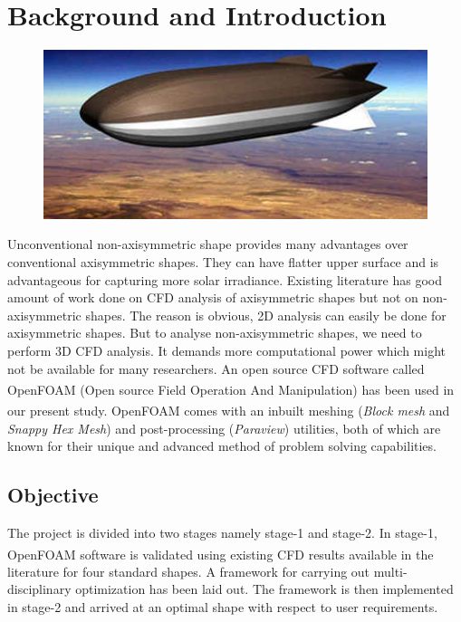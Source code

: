 
\newcommand{\etas}{\ensuremath{\eta_{\mathrm{s}}}}


\chapter{Background and Introduction}

\begin{figure}[htbp]
	\centering
	\includegraphics{intro/Stratellite.jpg}
	\label{Stratellite} %
\end{figure}

Unconventional non-axisymmetric shape provides many advantages over conventional axisymmetric shapes. They can have flatter upper surface and is advantageous for capturing more solar irradiance. Existing literature has good amount of work done on CFD analysis of axisymmetric shapes but not on non-axisymmetric shapes. The reason is obvious, 2D analysis can easily be done for axisymmetric shapes. But to analyse non-axisymmetric shapes, we need to perform 3D CFD analysis. It demands more computational power which might not be available for many researchers. An open source CFD software called OpenFOAM\textsuperscript{\textregistered} (Open source Field Operation And Manipulation) has been used in our present study. OpenFOAM\textsuperscript{\textregistered} comes with an inbuilt meshing (\textit{Block mesh} and \textit{Snappy Hex Mesh}) and post-processing (\textit{Paraview}) utilities, both of which are known for their unique and advanced method of problem solving capabilities. \\

\section{Objective}
The project is divided into two stages namely stage-1 and stage-2. In stage-1, OpenFOAM\textsuperscript{\textregistered} software is validated using existing CFD results available in the literature for four standard shapes. A framework for carrying out multi-disciplinary optimization has been laid out. The framework is then implemented in stage-2 and arrived at an optimal shape with respect to user requirements.

